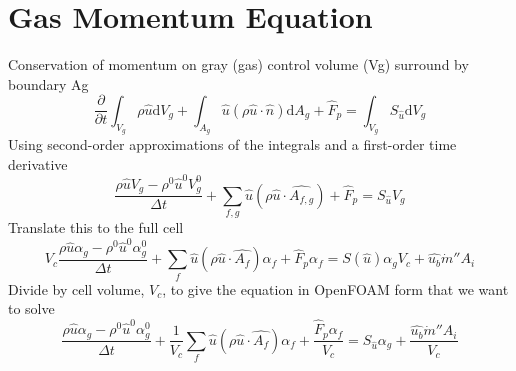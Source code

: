 \documentclass{article}
\renewcommand{\vec}[1]{\ensuremath{\hat{#1}}}
\renewcommand{\d}{\mathrm{d}}
\begin{document}
  \section{Gas Momentum Equation}
    Conservation of momentum on gray (gas) control volume (Vg) surround by boundary Ag
    \begin{equation*}
        \frac{\partial}{\partial t}\int_{V_g} \rho \vec{u} \d V_g
      + \int_{A_g} \vec{u} (\rho \vec{u} \cdot \vec{n}) \d A_g
      + \vec{F}_p
      = \int_{V_g} S_{\vec{u}} \d V_g
    \end{equation*}
    Using second-order approximations of the integrals and a first-order time derivative
    \begin{equation*}
        \frac{\rho \vec{u} V_g - \rho^0 \vec{u}^0 V_g^0}{\Delta t}
      + \sum_{f,g}\vec{u} (\rho \vec{u}\cdot\vec{A_{f,g}}) 
      + \vec{F}_p
      = S_{\vec{u}} V_g
    \end{equation*}
    Translate this to the full cell
    \begin{equation*}
        V_c\frac{\rho \vec{u} \alpha_g - \rho^0 \vec{u}^0 \alpha_g^0}{\Delta t}
      + \sum_{f}\vec{u} (\rho \vec{u}\cdot\vec{A_{f}})\alpha_f 
      + \vec{F}_p \alpha_f
      = S(\vec{u}) \alpha_g V_c
      + \vec{u_b} \dot{m}'' A_i
    \end{equation*}
    Divide by cell volume, $V_c$, to give the equation in OpenFOAM form that we want to solve
    \begin{equation}
      \label{eq:gasMom}
      \boxed{
        \frac{\rho \vec{u} \alpha_g - \rho^0 \vec{u}^0 \alpha_g^0}{\Delta t}
      + \frac{1}{V_c}\sum_{f} \vec{u} (\rho \vec{u}\cdot\vec{A_{f}})\alpha_f
      + \frac{\vec{F}_p \alpha_f}{V_c}
      = S_{\vec{u}} \alpha_g
      + \frac{\vec{u_b} \dot{m}'' A_i}{V_c}
      }
    \end{equation}
\end{document}
